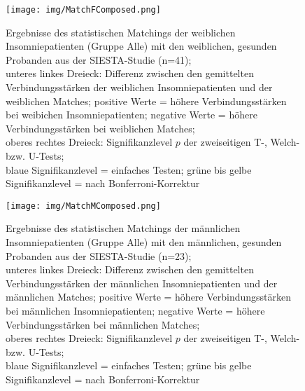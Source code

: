 \begin{figure}[H]
	\centering
	\texttt{[image: img/MatchFComposed.png]}
	\caption[Ergebnisse des statistischen Matchings der Insomniepatienten mit den gesunden Probanden]{Ergebnisse des statistischen Matchings der weiblichen Insomniepatienten (Gruppe Alle) mit den weiblichen, gesunden Probanden aus der SIESTA-Studie (n=41);\\unteres linkes Dreieck: Differenz zwischen den gemittelten Verbindungsstärken der weiblichen Insomniepatienten und der weiblichen Matches; positive Werte = höhere Verbindungsstärken bei weibichen Insomniepatienten; negative Werte = höhere Verbindungsstärken bei weiblichen Matches;\\oberes rechtes Dreieck: Signifikanzlevel $p$ der zweiseitigen T-, Welch- bzw. U-Tests;\\blaue Signifikanzlevel = einfaches Testen; grüne bis gelbe Signifikanzlevel = nach Bonferroni-Korrektur}
	\label{fig:MatchFComposed}
\end{figure}




\begin{figure}[H]
	\centering
	\texttt{[image: img/MatchMComposed.png]}
	\caption[Ergebnisse des statistischen Matchings der Insomniepatienten mit den gesunden Probanden]{Ergebnisse des statistischen Matchings der männlichen Insomniepatienten (Gruppe Alle) mit den männlichen, gesunden Probanden aus der SIESTA-Studie (n=23);\\unteres linkes Dreieck: Differenz zwischen den gemittelten Verbindungsstärken der männlichen Insomniepatienten und der männlichen Matches; positive Werte = höhere Verbindungsstärken bei männlichen Insomniepatienten; negative Werte = höhere Verbindungsstärken bei männlichen Matches;\\oberes rechtes Dreieck: Signifikanzlevel $p$ der zweiseitigen T-, Welch- bzw. U-Tests;\\blaue Signifikanzlevel = einfaches Testen; grüne bis gelbe Signifikanzlevel = nach Bonferroni-Korrektur}
	\label{fig:MatchMComposed}
\end{figure}

\restoregeometry